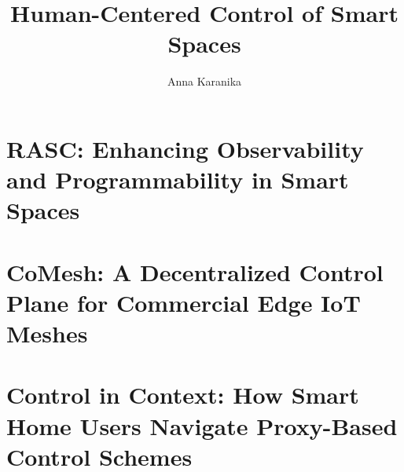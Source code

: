 \documentclass{uofithesis}
\title{Human-Centered Control of Smart Spaces
}
\author{Anna Karanika}
\begin{document}
\copyrightpage
\maketitle





\tableofcontents



\clearpage


\section{RASC: Enhancing Observability and Programmability in Smart Spaces}
\label{chapter:rasc}
\renewcommand{\sysname}{Rascal}  %













\section{CoMesh: A Decentralized Control Plane for Commercial Edge IoT Meshes}
\label{chapter:comesh}
\renewcommand{\sysname}{CoMesh}  %












\section{Control in Context: How Smart Home Users Navigate Proxy-Based Control Schemes}
\label{chapter:cic}








\end{document}
